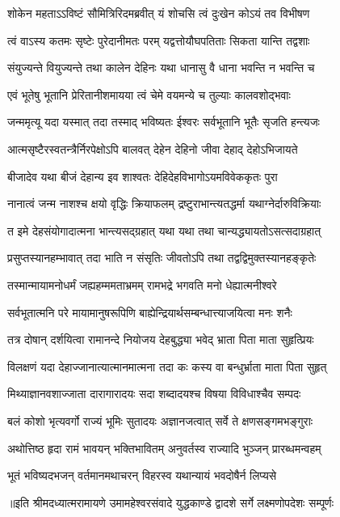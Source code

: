 


\addtocounter{shlokacount}{9}


\twolineshloka
{शोकेन महताऽऽविष्टं सौमित्रिरिदमब्रवीत्}
{यं शोचसि त्वं दुःखेन कोऽयं तव विभीषण} %

\twolineshloka
{त्वं वाऽस्य कतमः सृष्टेः पुरेदानीमतः परम्}
{यद्वत्तोयौघपतिताः सिकता यान्ति तद्वशाः} %

\twolineshloka
{संयुज्यन्ते वियुज्यन्ते तथा कालेन देहिनः}
{यथा धानासु वै धाना भवन्ति न भवन्ति च} %

\twolineshloka
{एवं भूतेषु भूतानि प्रेरितानीशमायया}
{त्वं चेमे वयमन्ये च तुल्याः कालवशोद्भवाः} %

\twolineshloka
{जन्ममृत्यू यदा यस्मात् तदा तस्माद् भविष्यतः}
{ईश्वरः सर्वभूतानि भूतैः सृजति हन्त्यजः} %

\twolineshloka
{आत्मसृष्टैरस्वतन्त्रैर्निरपेक्षोऽपि बालवत्}
{देहेन देहिनो जीवा देहाद् देहोऽभिजायते} %

\twolineshloka
{बीजादेव यथा बीजं देहान्य इव शाश्वतः}
{देहिदेहविभागोऽयमविवेककृतः पुरा} %

\twolineshloka
{नानात्वं जन्म नाशश्च क्षयो वृद्धिः क्रियाफलम्}
{द्रष्टुराभान्त्यतद्धर्मा यथाग्नेर्दारुविक्रियाः} %

\twolineshloka
{त इमे देहसंयोगादात्मना भान्त्यसद्ग्रहात्}
{यथा यथा तथा चान्यद्ध्यायतोऽसत्सदाग्रहात्} %

\twolineshloka
{प्रसुप्तस्यानहम्भावात् तदा भाति न संसृतिः}
{जीवतोऽपि तथा तद्वद्विमुक्तस्यानहङ्कृतेः} %

\twolineshloka
{तस्मान्मायामनोधर्मं जह्यहम्ममताभ्रमम्}
{रामभद्रे भगवति मनो धेह्यात्मनीश्वरे} %

\twolineshloka
{सर्वभूतात्मनि परे मायामानुषरूपिणि}
{बाह्येन्द्रियार्थसम्बन्धात्त्याजयित्वा मनः शनैः} %

\twolineshloka
{तत्र दोषान् दर्शयित्वा रामानन्दे नियोजय}
{देहबुद्ध्या भवेद् भ्राता पिता माता सुहृत्प्रियः} %

\twolineshloka
{विलक्षणं यदा देहाज्जानात्यात्मानमात्मना}
{तदा कः कस्य वा बन्धुर्भ्राता माता पिता सुहृत्} %

\twolineshloka
{मिथ्याज्ञानवशाज्जाता दारागारादयः सदा}
{शब्दादयश्च विषया विविधाश्चैव सम्पदः} %

\twolineshloka
{बलं कोशो भृत्यवर्गो राज्यं भूमिः सुतादयः}
{अज्ञानजत्वात् सर्वे ते क्षणसङ्गमभङ्गुराः} %

\twolineshloka
{अथोत्तिष्ठ हृदा रामं भावयन् भक्तिभावितम्}
{अनुवर्तस्व राज्यादि भुञ्जन् प्रारब्धमन्वहम्} %

\twolineshloka
{भूतं भविष्यदभजन् वर्तमानमथाचरन्}
{विहरस्व यथान्यायं भवदोषैर्न लिप्यसे} %

{॥इति श्रीमदध्यात्मरामायणे उमामहेश्वरसंवादे युद्धकाण्डे द्वादशे  सर्गे  लक्ष्मणोपदेशः  सम्पूर्णः}

